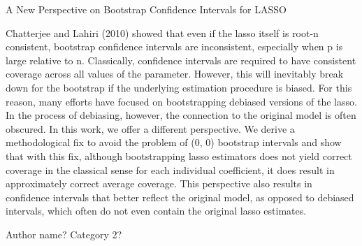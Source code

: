 A New Perspective on Bootstrap Confidence Intervals for LASSO

Chatterjee and Lahiri (2010) showed that even if the lasso itself is root-n consistent, bootstrap confidence intervals are inconsistent, especially when p is large relative to n. Classically, confidence intervals are required to have consistent coverage across all values of the parameter. However, this will inevitably break down for the bootstrap if the underlying estimation procedure is biased. For this reason, many efforts have focused on bootstrapping debiased versions of the lasso. In the process of debiasing, however, the connection to the original model is often obscured. In this work, we offer a different perspective. We derive a methodological fix to avoid the problem of (0, 0) bootstrap intervals and show that with this fix, although bootstrapping lasso estimators does not yield correct coverage in the classical sense for each individual coefficient, it does result in approximately correct average coverage. This perspective also results in confidence intervals that better reflect the original model, as opposed to debiased intervals, which often do not even contain the original lasso estimates.

Author name?
Category 2?
